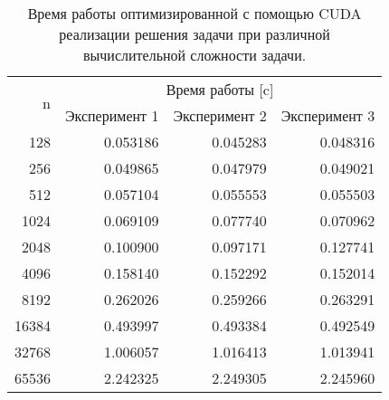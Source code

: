 \begin{table}[htbp]
    \centering
     \begin{tabular}{rrrr}  \toprule    \multirow{2}{*}{n}   & \multicolumn{3}{c}{Время работы {[}c{]}}                                                     \\
    & Эксперимент 1        & \multicolumn{1}{c}{Эксперимент 2} & \multicolumn{1}{c}{Эксперимент 3} \\  
    \midrule  128 &                0.053186 &                0.045283 &                0.048316 \\  256 &                0.049865 &                0.047979 &                0.049021 \\  512 &                0.057104 &                0.055553 &                0.055503 \\ 1024 &                0.069109 &                0.077740 &                0.070962 \\ 2048 &                0.100900 &                0.097171 &                0.127741 \\ 4096 &                0.158140 &                0.152292 &                0.152014 \\ 8192 &                0.262026 &                0.259266 &                0.263291 \\16384 &                0.493997 &                0.493384 &                0.492549 \\32768 &                1.006057 &                1.016413 &                1.013941 \\65536 &                2.242325 &                2.249305 &                2.245960 \\  \bottomrule  \end{tabular} 
    \caption{Время работы оптимизированной с помощью CUDA реализации решения задачи при различной вычислительной сложности задачи.}
    \label{tab:cuda_time}
\end{table}